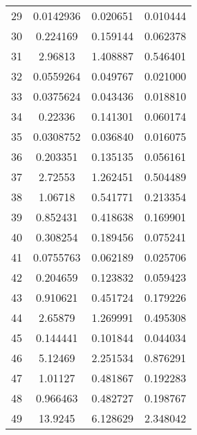\documentclass[a4paper,11pt,oneside,openany]{jsbook}
\begin{document}
\begin{table}[]
{\begin{tabular}{|c|c|c|c|}
29 & 0.0142936 & 0.020651 & 0.010444 \\
30 & 0.224169 & 0.159144 & 0.062378 \\
31 & 2.96813 & 1.408887 & 0.546401 \\
32 & 0.0559264 & 0.049767 & 0.021000 \\
33 & 0.0375624 & 0.043436 & 0.018810 \\
34 & 0.22336 & 0.141301 & 0.060174 \\
35 & 0.0308752 & 0.036840 & 0.016075 \\
36 & 0.203351 & 0.135135 & 0.056161 \\
37 & 2.72553 & 1.262451 & 0.504489 \\
38 & 1.06718 & 0.541771 & 0.213354 \\
39 & 0.852431 & 0.418638 & 0.169901 \\
40 & 0.308254 & 0.189456 & 0.075241 \\
41 & 0.0755763 & 0.062189 & 0.025706 \\
42 & 0.204659 & 0.123832 & 0.059423 \\
43 & 0.910621 & 0.451724 & 0.179226 \\
44 & 2.65879 & 1.269991 & 0.495308 \\
45 & 0.144441 & 0.101844 & 0.044034 \\
46 & 5.12469 & 2.251534 & 0.876291 \\
47 & 1.01127 & 0.481867 & 0.192283 \\
48 & 0.966463 & 0.482727 & 0.198767 \\
49 & 13.9245 & 6.128629 & 2.348042 \\ \hline
\end{tabular}
}
\end{table}
\end{document}
